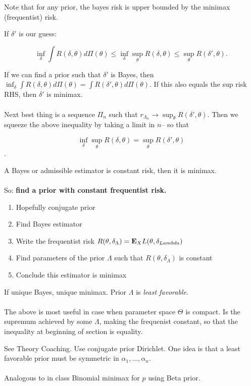 \documentclass{article}
\begin{document}
Note that for any prior, the bayes risk is upper bounded by the minimax (frequentist) risk. 

If $\delta'$ is our guess:

$$\inf_\delta \int R(\delta, \theta) d\Pi (\theta) \leq \inf_\delta \sup_\theta R(\delta, \theta) \leq \sup_\theta R(\delta ', \theta).$$

If we can find a prior such that $\delta'$ is Bayes, then 
$\inf_\delta \int R(\delta, \theta) d\Pi (\theta) = \int R(\delta' , \theta) d\Pi(\theta)$. If this also equals the sup risk RHS, then $\delta'$ is minimax. \\ \\ 

Next best thing is a sequence $\Pi_n$ such that $r_{\Lambda_n} \to \sup_\theta R(\delta ', \theta)$. Then we squeeze the above inequality by taking a limit in $n$-- so that 

$$\inf_\delta \sup_\theta R(\delta, \theta) = \sup_\theta R(\delta', \theta)$$. 



\begin{recipe}
	A Bayes or admissible estimator is constant risk, then it is minimax. \\\\
	
	So: \textbf{find a prior with constant frequentist risk. }
	\begin{enumerate}
		\item Hopefully conjugate prior
		\item Find Bayes estimator 
		\item Write the frequentist risk $R(\theta,\delta_{\Lambda}) = \mathbf{E}_X L(\theta, \delta_{Lambda})$
		\item Find parameters of the prior $\Lambda$ such that $R(\theta,\delta_\Lambda)$ is constant
		\item Conclude this estimator is minimax
	\end{enumerate}
	If unique Bayes, unique minimax. Prior $\Lambda$ is \textit{least favorable}.\\ \\ 
	
	The above is most useful in case when parameter space $\Theta$ is compact. Is the supremum achieved by some $\Lambda$, making the frequenist constant, so that the inequality at beginning of section is equality. 
\end{recipe}

\begin{example}
See Theory Coaching. Use conjugate prior Dirichlet. One idea is that a least favorable prior must be symmetric in $\alpha_1,\ldots, \alpha_n$. \\ \\ 

Analogous to in class Binomial minimax for $p$ using Beta prior. 
\end{example}
\end{document}
